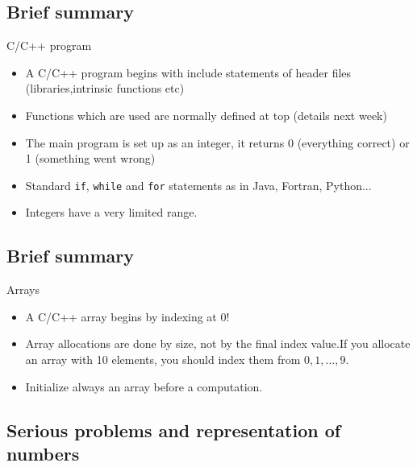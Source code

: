 \documentclass[%
oneside,                 %
final,                   %
10pt]{article}
\begin{document}
\subsection{Brief summary}

\begin{block}{C/C++ program }
\begin{itemize}
  \item A C/C++ program begins with include statements of header files (libraries,intrinsic functions etc)

  \item Functions which are used are normally defined at top (details next week)

  \item The main program is set up as an integer, it returns 0 (everything correct) or 1 (something went wrong)

  \item Standard \Verb!if!, \Verb!while! and \Verb!for! statements as in Java, Fortran, Python...

  \item Integers have a very limited range.
\end{itemize}

\noindent
\end{block}

\subsection{Brief summary}

\begin{block}{Arrays }
\begin{itemize}
  \item A C/C++ array begins by indexing at 0!

  \item Array allocations are done by size, not by the final index value.If you allocate an array with 10 elements, you should index them from $0,1,\dots, 9$.

  \item Initialize always an array before a computation.
\end{itemize}

\noindent
\end{block}

\subsection{Serious problems and representation of numbers}
\end{document}
